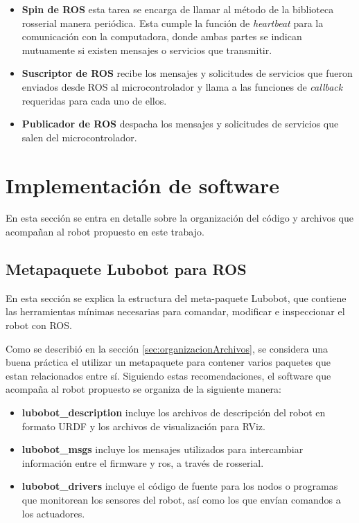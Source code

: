 \begin{itemize}
  \item \textbf{Spin de ROS} esta tarea se encarga de llamar al método  de la biblioteca rosserial manera periódica. Esta cumple la función de \textit{heartbeat} para la comunicación con la computadora, donde ambas partes se indican mutuamente si existen mensajes o servicios que transmitir.
  \item \textbf{Suscriptor de ROS} recibe los mensajes y solicitudes de servicios que fueron enviados desde ROS al microcontrolador y llama a las funciones de \textit{callback} requeridas para cada uno de ellos.
  \item \textbf{Publicador de ROS} despacha los mensajes y solicitudes de servicios que salen del microcontrolador.
\end{itemize}

\section{Implementación de software}

En esta sección se entra en detalle sobre la organización del código y archivos que acompañan al robot propuesto en este trabajo.

\subsection{Metapaquete Lubobot para ROS}

En esta sección se explica la estructura del meta-paquete Lubobot, que contiene las herramientas mínimas necesarias para comandar, modificar e inspeccionar el robot con ROS.

Como se describió en la sección \ref{sec:organizacionArchivos}, se considera una buena práctica el utilizar un metapaquete para contener varios paquetes que estan relacionados entre sí. Siguiendo estas recomendaciones, el software que acompaña al robot propuesto se organiza de la siguiente manera:

\begin{itemize}
  \item \textbf{lubobot\_description} incluye los archivos de descripción del robot en formato URDF y los archivos de visualización para RViz.
  \item \textbf{lubobot\_msgs} incluye los mensajes utilizados para intercambiar información entre el firmware y ros, a través de rosserial.
  \item \textbf{lubobot\_drivers} incluye el código de fuente para los nodos o programas que monitorean los sensores del robot, así como los que envían comandos a los actuadores.
\end{itemize}

